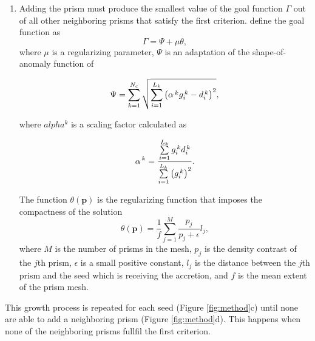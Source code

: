 \documentclass[twocolumn,final]{svjour3}
\newcommand{\vect}[1]{\mathbf{#1}}
\begin{document}
\begin{sloppypar}
\begin{enumerate}
    \item Adding the prism must produce
    the smallest value of the goal function $\Gamma$
    out of all other neighboring prisms
    that satisfy the first criterion.
    \citet{uieda_shape} define the goal function as
    \begin{equation}
        \Gamma = \Psi + \mu\theta,
        \label{eq:goal}
    \end{equation}
    where $\mu$ is a regularizing parameter,
    $\Psi$ is an adaptation of the shape-of-anomaly function of \citet{rene}
    \citep{uieda_planting}

    \begin{equation}
        \Psi = \sum\limits_{k=1}^{N_{c}} {
        \sqrt{
            \sum\limits_{i=1}^{L_k}
            \left(
                \alpha^{\thinspace k} g_{i}^{\thinspace k} -
                d_{i}^{\thinspace k}
            \right)^{2}
        }},
        \label{eq:shapek}
    \end{equation}

    where $alpha^k$ is a scaling factor calculated as

    \begin{equation}
        \alpha^{\thinspace k} = \dfrac{
            \sum\limits_{i=1}^{L_k} g_{i}^{\thinspace k} d_{i}^{\thinspace k}
        }{
            \sum\limits_{i=1}^{L_k}\left( g_{i}^{\thinspace k}\right)^{2}
        }.
        \label{eq:alpha}
    \end{equation}

    The function $\theta(\vect{p})$
    is the regularizing function
    that imposes the compactness of the solution
    \citep{uieda_planting}
    \begin{equation}
        \theta(\vect{p}) = \frac{1}{f} \sum\limits_{j=1}^{M}
        \dfrac{p_j}{p_j + \epsilon} l_{j},
        \label{eq:regul}
    \end{equation}
    where $M$ is the number of prisms in the mesh,
    $p_{j}$ is the density contrast of the $j$th prism,
    $\epsilon$ is a small positive constant,
    $l_{j}$ is the distance between the $j$th prism
    and the seed which is receiving the accretion,
    and $f$ is the mean extent of the prism mesh.
\end{enumerate}

This growth process
is repeated for each seed (Figure \ref{fig:method}c)
until none are able
to add a neighboring prism (Figure \ref{fig:method}d).
This happens when
none of the neighboring prisms
fullfil the first criterion.
\end{sloppypar}
\end{document}
